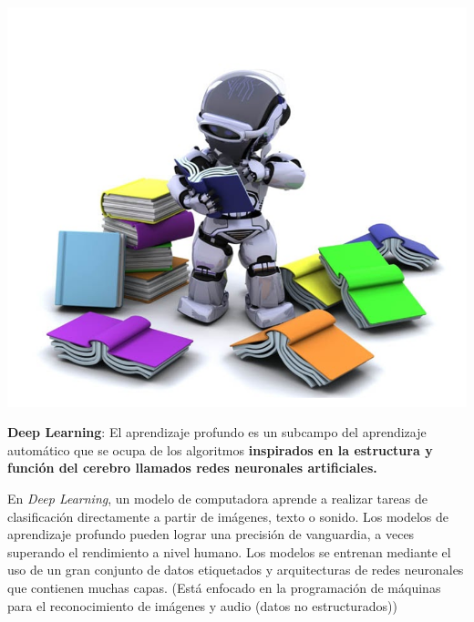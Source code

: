 \documentclass[
]{book}
\begin{document}
\begin{center}\includegraphics{img/01-intro2ds/05_supervisado_robo} \end{center}

\textbf{Deep Learning}: El aprendizaje profundo es un subcampo del aprendizaje automático que se ocupa de los algoritmos \textbf{inspirados en la estructura y función del cerebro llamados redes neuronales artificiales.}

En \emph{Deep Learning}, un modelo de computadora aprende a realizar tareas de clasificación directamente a partir de imágenes, texto o sonido. Los modelos de aprendizaje profundo pueden lograr una precisión de vanguardia, a veces superando el rendimiento a nivel humano. Los modelos se entrenan mediante el uso de un gran conjunto de datos etiquetados y arquitecturas de redes neuronales que contienen muchas capas. (Está enfocado en la programación de máquinas para el reconocimiento de imágenes y audio (datos no estructurados))
\end{document}
